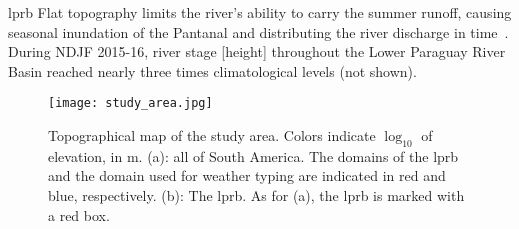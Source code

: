 \begin{block}{\acrlong{lprb}}
    Flat topography limits the river’s ability to carry the summer runoff, causing seasonal inundation of the Pantanal and distributing the river discharge in time~\cite{Barros:2004wg, Bravo:2012iq}.
    During NDJF 2015-16, river stage [height] throughout the Lower Paraguay River Basin reached nearly three times climatological levels (not shown).
    \begin{framed}
        \begin{figure}
            \noindent\texttt{[image: study\_area.jpg]}
            \caption{
                Topographical map of the study area.
                Colors indicate $\log_{10}$ of elevation, in \si{\meter}.
                (a): all of South America.
                The domains of the \acrlong{lprb} and the domain used for weather typing are indicated in red and blue, respectively.
                (b): The \acrfull{lprb}.
                As for (a), the \gls{lprb} is marked with a red box.
            }\label{fig:study-area}
        \end{figure}
    \end{framed}
\end{block}
